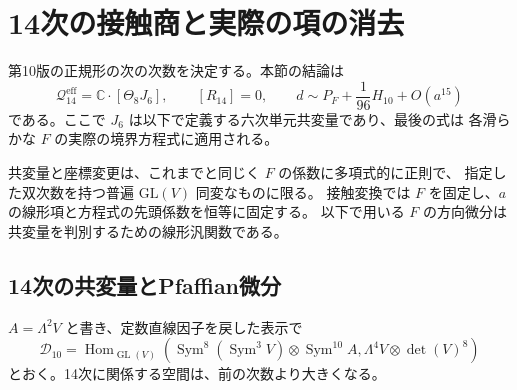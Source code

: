 \documentclass[a4paper,11pt]{ltjsarticle}
\theoremstyle{definition}
\begin{document}
\clearpage
\section{14次の接触商と実際の項の消去}
\label{sec:contact-fourteen}

第10版の正規形の次の次数を決定する。本節の結論は
\[
 \mathcal Q^{\mathrm{eff}}_{14}=\mathbb C\cdot[\Theta_8J_6],\qquad
 [R_{14}]=0,\qquad
 d\sim P_F+\frac1{96}H_{10}+O(a^{15})
\]
である。ここで $J_6$ は以下で定義する六次単元共変量であり、最後の式は
各滑らかな $F$ の実際の境界方程式に適用される。

共変量と座標変更は、これまでと同じく $F$ の係数に多項式的に正則で、
指定した双次数を持つ普遍 $\mathrm{GL}(V)$ 同変なものに限る。
接触変換では $F$ を固定し、$a$ の線形項と方程式の先頭係数を恒等に固定する。
以下で用いる $F$ の方向微分は共変量を判別するための線形汎関数である。

\subsection{14次の共変量とPfaffian微分}
\label{subsec:v11-fourteenth-characters}

$A=\Lambda^2V$ と書き、定数直線因子を戻した表示で
\[
 \mathcal D_{10}=\operatorname{Hom}_{\operatorname{GL}(V)}
 \left(\operatorname{Sym}^8(\operatorname{Sym}^3V)
       \otimes\operatorname{Sym}^{10}A,
       \Lambda^4V\otimes\det(V)^8\right)
\]
とおく。14次に関係する空間は、前の次数より大きくなる。
\end{document}
